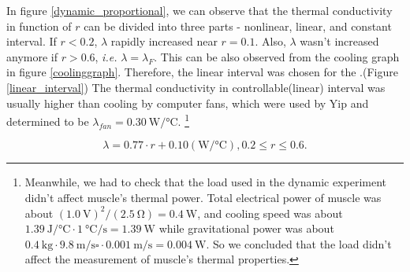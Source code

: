 In figure \ref{dynamic_proportional}, we can observe that the thermal conductivity in function of $r$ can be divided into three parts - nonlinear, linear, and constant interval. If $r<0.2$, $\lambda$ rapidly increased near $r=0.1$. Also, $\lambda$ wasn't increased anymore if $r>0.6$, {\it i.e.} $\lambda = \lambda_{F}$. This can be also observed from the cooling graph in figure \ref{coolinggraph}.
Therefore, the linear interval was chosen for the \Apcnospace.(Figure \ref{linear_interval}) The thermal conductivity in controllable(linear) interval was usually higher than cooling by computer fans, which were used by Yip \etalspace \cite{yip} and determined to be $\lambda_{fan}=\SI{0.30}{\watt\per\degreeCelsius}$.
\footnote{
	Meanwhile, we had to check that the load used in the dynamic experiment didn't affect muscle's thermal power. 
	Total electrical power of muscle was about $(\SI{1.0}{\volt})^2/(\SI{2.5}{\ohm})=\SI{0.4}{\watt}$, and cooling speed was about $\SI{1.39}{\joule\per\degreeCelsius} \cdot \SI{1}{\degreeCelsius\per\second}=\SI{1.39}{\watt}$ while gravitational power was about  $\SI{0.4}{\kilo\gram} \cdot  \SI{9.8}{\meter\per\second\square} \cdot \SI{0.001}{\meter\per\second}=\SI{0.004}{\watt}$. So we concluded that the load didn't affect the measurement of muscle's thermal properties.
}

\begin{equation} \label{lambda_control}
\lambda = 0.77\cdot r + 0.10 (\si{\watt\per\degreeCelsius}), 0.2\leq r \leq 0.6.
\end{equation}





